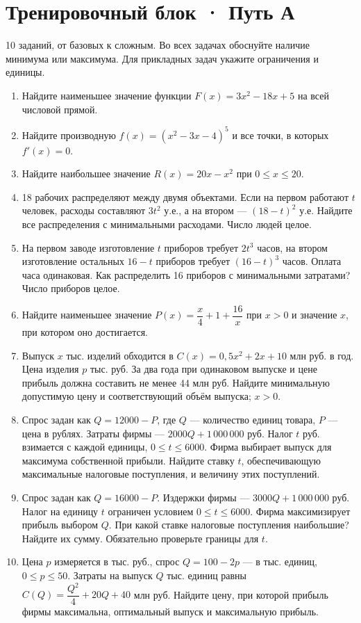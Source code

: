 \documentclass[a4paper,11pt]{article}
\newcommand{\topic}[1]{\Needspace{5\baselineskip}\section*{\color{darkaccent}#1}\vspace{-2mm}}
\begin{document}
\topic{Тренировочный блок · Путь А}
\textcolor{softgray}{10 заданий, от базовых к сложным. Во всех задачах обоснуйте наличие минимума или максимума. Для прикладных задач укажите ограничения и единицы.}
\begin{enumerate}[label=\textbf{\arabic*.}]
\item Найдите наименьшее значение функции $F(x)=3x^2-18x+5$ на всей числовой прямой.

\item Найдите производную $f(x)=(x^2-3x-4)^5$ и все точки, в которых $f'(x)=0$.

\item Найдите наибольшее значение $R(x)=20x-x^2$ при $0\le x\le20$.

\item 18 рабочих распределяют между двумя объектами. Если на первом работают $t$ человек, расходы составляют $3t^2$ у.е., а на втором — $(18-t)^2$ у.е. Найдите все распределения с минимальными расходами. Число людей целое.

\item На первом заводе изготовление $t$ приборов требует $2t^3$ часов, на втором изготовление остальных $16-t$ приборов требует $(16-t)^3$ часов. Оплата часа одинаковая. Как распределить 16 приборов с минимальными затратами? Число приборов целое.

\item Найдите наименьшее значение $P(x)=\dfrac{x}{4}+1+\dfrac{16}{x}$ при $x>0$ и значение $x$, при котором оно достигается.
\clearpage
\item Выпуск $x$ тыс. изделий обходится в $C(x)=0{,}5x^2+2x+10$ млн руб. в год. Цена изделия $p$ тыс. руб. За два года при одинаковом выпуске и цене прибыль должна составить не менее 44 млн руб. Найдите минимальную допустимую цену и соответствующий объём выпуска; $x>0$.

\item Спрос задан как $Q=12000-P$, где $Q$ — количество единиц товара, $P$ — цена в рублях. Затраты фирмы — $2000Q+1\,000\,000$ руб. Налог $t$ руб. взимается с каждой единицы, $0\le t\le6000$. Фирма выбирает выпуск для максимума собственной прибыли. Найдите ставку $t$, обеспечивающую максимальные налоговые поступления, и величину этих поступлений.

\item Спрос задан как $Q=16000-P$. Издержки фирмы — $3000Q+1\,000\,000$ руб. Налог на единицу $t$ ограничен условием $0\le t\le6000$. Фирма максимизирует прибыль выбором $Q$. При какой ставке налоговые поступления наибольшие? Найдите их сумму. Обязательно проверьте границы для $t$.

\item Цена $p$ измеряется в тыс. руб., спрос $Q=100-2p$ — в тыс. единиц, $0\le p\le50$. Затраты на выпуск $Q$ тыс. единиц равны $C(Q)=\dfrac{Q^2}{4}+20Q+40$ млн руб. Найдите цену, при которой прибыль фирмы максимальна, оптимальный выпуск и максимальную прибыль.
\end{enumerate}
\clearpage
\end{document}
